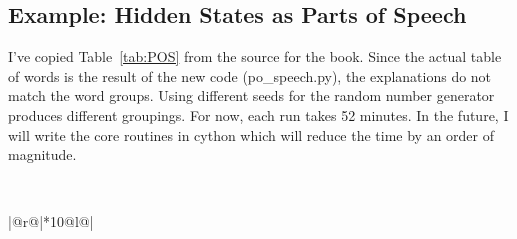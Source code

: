 \documentclass[prelim,showlabels]{book}
\newcommand{\plotsize}{\small}
\begin{document}
\subsection{Example: Hidden States as Parts of Speech}
\label{sec:POSpeech}

I've copied Table~\ref{tab:POS} from the source for the book.  Since
the actual table of words is the result of the new code
(po\_speech.py), the explanations do not match the word groups.  Using
different seeds for the random number generator produces different
groupings.  For now, each run takes 52 minutes.  In the future, I will
write the core routines in cython which will reduce the time by an order of
magnitude.
\begin{table}[htb]
  \caption[Words most frequently associated with each state.]%
  {Words most frequently associated with each state.  While I have no
    interpretation for three of the states, some of the following
    interpretations of the other states are strikingly successful.}
  \begin{center}{\plotsize%
      \\[2.0ex]
      \begin{tabular}{|@{\hspace{0.10em}}r@{\hspace{0.40em}}|*{10}{@{\hspace{0.28em}}l@{\hspace{0.28em}}}|}
        \hline  [0.5ex]
        \hline
      \end{tabular}
    }\end{center}
  \label{tab:POS}
\end{table}
\end{document}
